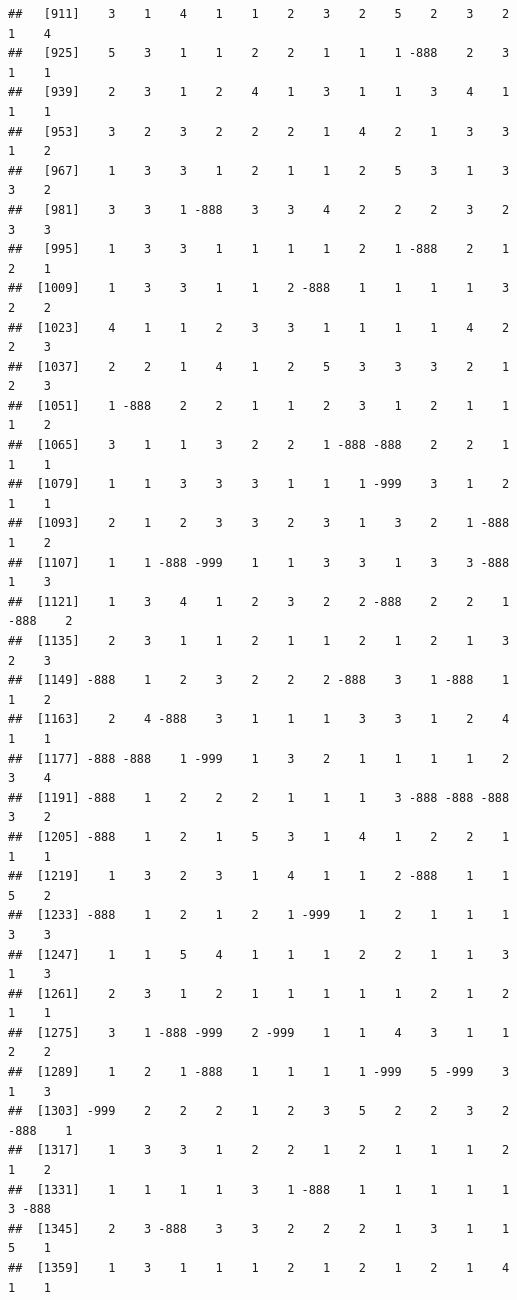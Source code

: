 \documentclass[
  12pt,
  openany]{book}
\begin{document}
\begin{verbatim}
##   [911]    3    1    4    1    1    2    3    2    5    2    3    2    1    4
##   [925]    5    3    1    1    2    2    1    1    1 -888    2    3    1    1
##   [939]    2    3    1    2    4    1    3    1    1    3    4    1    1    1
##   [953]    3    2    3    2    2    2    1    4    2    1    3    3    1    2
##   [967]    1    3    3    1    2    1    1    2    5    3    1    3    3    2
##   [981]    3    3    1 -888    3    3    4    2    2    2    3    2    3    3
##   [995]    1    3    3    1    1    1    1    2    1 -888    2    1    2    1
##  [1009]    1    3    3    1    1    2 -888    1    1    1    1    3    2    2
##  [1023]    4    1    1    2    3    3    1    1    1    1    4    2    2    3
##  [1037]    2    2    1    4    1    2    5    3    3    3    2    1    2    3
##  [1051]    1 -888    2    2    1    1    2    3    1    2    1    1    1    2
##  [1065]    3    1    1    3    2    2    1 -888 -888    2    2    1    1    1
##  [1079]    1    1    3    3    3    1    1    1 -999    3    1    2    1    1
##  [1093]    2    1    2    3    3    2    3    1    3    2    1 -888    1    2
##  [1107]    1    1 -888 -999    1    1    3    3    1    3    3 -888    1    3
##  [1121]    1    3    4    1    2    3    2    2 -888    2    2    1 -888    2
##  [1135]    2    3    1    1    2    1    1    2    1    2    1    3    2    3
##  [1149] -888    1    2    3    2    2    2 -888    3    1 -888    1    1    2
##  [1163]    2    4 -888    3    1    1    1    3    3    1    2    4    1    1
##  [1177] -888 -888    1 -999    1    3    2    1    1    1    1    2    3    4
##  [1191] -888    1    2    2    2    1    1    1    3 -888 -888 -888    3    2
##  [1205] -888    1    2    1    5    3    1    4    1    2    2    1    1    1
##  [1219]    1    3    2    3    1    4    1    1    2 -888    1    1    5    2
##  [1233] -888    1    2    1    2    1 -999    1    2    1    1    1    3    3
##  [1247]    1    1    5    4    1    1    1    2    2    1    1    3    1    3
##  [1261]    2    3    1    2    1    1    1    1    1    2    1    2    1    1
##  [1275]    3    1 -888 -999    2 -999    1    1    4    3    1    1    2    2
##  [1289]    1    2    1 -888    1    1    1    1 -999    5 -999    3    1    3
##  [1303] -999    2    2    2    1    2    3    5    2    2    3    2 -888    1
##  [1317]    1    3    3    1    2    2    1    2    1    1    1    2    1    2
##  [1331]    1    1    1    1    3    1 -888    1    1    1    1    1    3 -888
##  [1345]    2    3 -888    3    3    2    2    2    1    3    1    1    5    1
##  [1359]    1    3    1    1    1    2    1    2    1    2    1    4    1    1

\end{verbatim}
\end{document}
